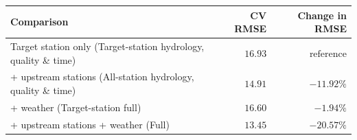 \begin{tabularx}{\textwidth}{@{}Xrr@{}}
\toprule
\textbf{Comparison} & \textbf{CV RMSE} & \textbf{Change in RMSE} \\
\midrule
Target station only (Target-station hydrology, quality \& time) & $16.93$ & $\text{reference}$ \\
\addlinespace
+ upstream stations (All-station hydrology, quality \& time) & $14.91$ & $-11.92\%$ \\
\addlinespace
+ weather (Target-station full) & $16.60$ & $-1.94\%$ \\
\addlinespace
+ upstream stations + weather (Full) & $13.45$ & $-20.57\%$ \\
\bottomrule
\end{tabularx}
